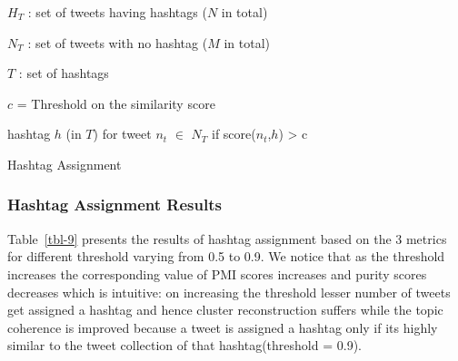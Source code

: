 \documentclass[10pt,a5paper,twoside]{article}
\newcommand{\var}{v}
\begin{document}
\incmargin{1.5em}
\linesnumbered
\begin{algorithm}[hb!]
\dontprintsemicolon

\Input
{
$H_T$ : set of tweets having hashtags ($N$ in total)
 
$N_T$ : set of tweets with no hashtag ($M$ in total)
 
$T$ : set of hashtags
 
$c$ = \footnotesize{Threshold} on the similarity score
}
\Output
{
hashtag $h$ (in $T$) for tweet $n_t$ $\in$ $N_T$ if score($n_t$,$h$) > c
}
\BlankLine
{\small
{}
}
\caption{{\sc Hashtag Assignment} \label{alg-1}}
\end{algorithm}
\decmargin{1.5em}


\subsubsection{Hashtag Assignment Results}
Table~\ref{tbl-9} presents the results of hashtag assignment based on the 3 metrics for different threshold varying from 0.5 to 0.9. We notice that as the threshold increases the corresponding value of PMI scores increases and purity scores decreases which is intuitive: on increasing the threshold lesser number of tweets get assigned a hashtag and hence cluster reconstruction suffers while the topic coherence is improved because a tweet is assigned a hashtag only if its highly similar to the tweet collection of that hashtag(threshold = 0.9). 
\\
\end{document}
